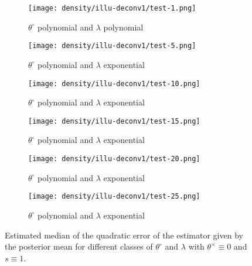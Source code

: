 \begin{figure}
\centering
\begin{subfigure}{.40\textwidth}
  \centering
  \texttt{[image: density/illu-deconv1/test-1.png]}
  \caption{$\theta^{\circ}$ polynomial and $\lambda$ polynomial}
  \label{fig3:sub1}
\end{subfigure}%
\begin{subfigure}{.40\textwidth}
  \centering
  \texttt{[image: density/illu-deconv1/test-5.png]}
  \caption{$\theta^{\circ}$ polynomial and $\lambda$ exponential}
  \label{fig3:sub2}
\end{subfigure}

\begin{subfigure}{.40\textwidth}
  \centering
  \texttt{[image: density/illu-deconv1/test-10.png]}
  \caption{$\theta^{\circ}$ polynomial and $\lambda$ exponential}
  \label{fig3:sub2}
\end{subfigure}
\begin{subfigure}{.40\textwidth}
  \centering
  \texttt{[image: density/illu-deconv1/test-15.png]}
  \caption{$\theta^{\circ}$ polynomial and $\lambda$ exponential}
  \label{fig3:sub2}
\end{subfigure}

\begin{subfigure}{.40\textwidth}
  \centering
  \texttt{[image: density/illu-deconv1/test-20.png]}
  \caption{$\theta^{\circ}$ polynomial and $\lambda$ exponential}
  \label{fig3:sub2}
\end{subfigure}
\begin{subfigure}{.40\textwidth}
  \centering
  \texttt{[image: density/illu-deconv1/test-25.png]}
  \caption{$\theta^{\circ}$ polynomial and $\lambda$ exponential}
  \label{fig3:sub2}
\end{subfigure}
\caption{Estimated median of the quadratic error of the estimator given by the posterior mean for different classes of $\theta^{\circ}$ and $\lambda$ with $\theta^{\times} \equiv 0$ and $s \equiv 1$.}
\label{EQM}
\end{figure}




